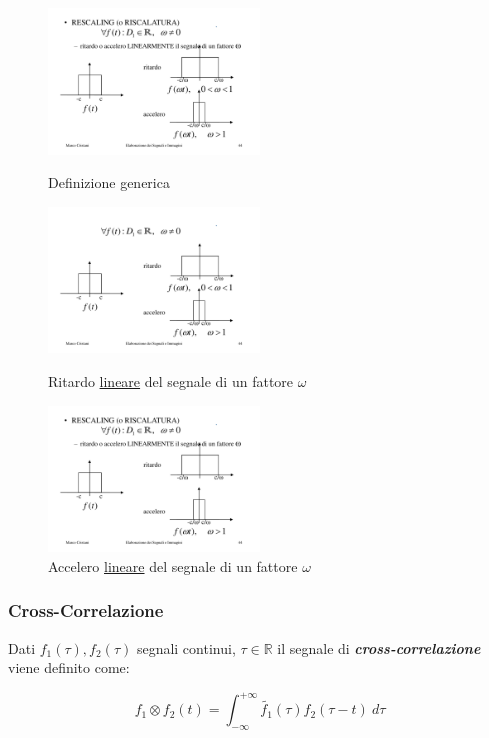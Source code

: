 \documentclass[a4paper]{article}
\begin{document}
	\begin{figure}[!htp]
		\centering
		\includegraphics[width=0.5\textwidth]{img/rescaling.pdf}
		\caption{Definizione generica}\label{rescaling}
		\includegraphics[width=0.5\textwidth]{img/rescaling_ritardo.pdf}
		\caption{Ritardo \underline{lineare} del segnale di un fattore $\omega$}\label{rescaling_ritardo}
		\includegraphics[width=0.5\textwidth]{img/rescaling_accelero.pdf}
		\caption{Accelero \underline{lineare} del segnale di un fattore $\omega$}\label{rescaling_accelero}
	\end{figure}

	\subsubsection{Cross-Correlazione}\label{cross correlazione}
	
	Dati $f_1(\tau), f_2(\tau)$ segnali continui, $\tau\in\mathbb{R}$ il segnale di \textbf{\emph{cross-correlazione}} viene definito come:
	
	\begin{equation*}
		\displaystyle f_1 \otimes f_2 (t) = \int_{-\infty}^{+\infty} \tilde{f_1}(\tau) f_2(\tau - t)\: d\tau
	\end{equation*}
\end{document}
